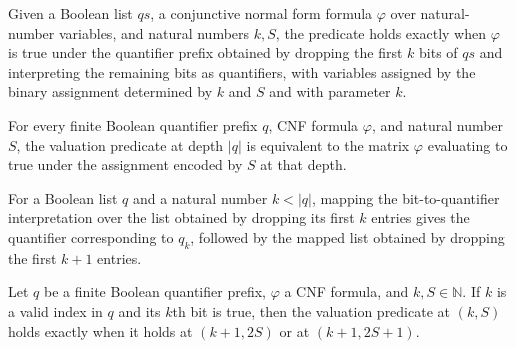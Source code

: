 \begin{definition}
\label{Complexity.LogProg.TQBFARM.Val}
\leanok
{}
Given a Boolean list $qs$, a conjunctive normal form formula $\varphi$ over
natural-number variables, and natural numbers $k,S$, the predicate holds exactly when
$\varphi$ is true under the quantifier prefix obtained by dropping the first $k$ bits of
$qs$ and interpreting the remaining bits as quantifiers, with variables assigned by the
binary assignment determined by $k$ and $S$ and with parameter $k$.
\end{definition}

\begin{theorem}
\label{Complexity.LogProg.TQBFARM.val_leaf}
\leanok
{}
For every finite Boolean quantifier prefix $q$, CNF formula $\varphi$, and natural
number $S$, the valuation predicate at depth $|q|$ is equivalent to the matrix $\varphi$
evaluating to true under the assignment encoded by $S$ at that depth.
\end{theorem}

\begin{theorem}
\label{Complexity.LogProg.TQBFARM.drop_map_eq}
\leanok
{}
For a Boolean list $q$ and a natural number $k<|q|$, mapping the bit-to-quantifier
interpretation over the list obtained by dropping its first $k$ entries gives the
quantifier corresponding to $q_k$, followed by the mapped list obtained by dropping the
first $k+1$ entries.
\end{theorem}

\begin{theorem}
\label{Complexity.LogProg.TQBFARM.val_ex}
\leanok
{}
Let $q$ be a finite Boolean quantifier prefix, $\varphi$ a CNF formula, and
$k,S\in\mathbb{N}$. If $k$ is a valid index in $q$ and its $k$th bit is true, then the
valuation predicate at $(k,S)$ holds exactly when it holds at $(k+1,2S)$ or at
$(k+1,2S+1)$.
\end{theorem}

